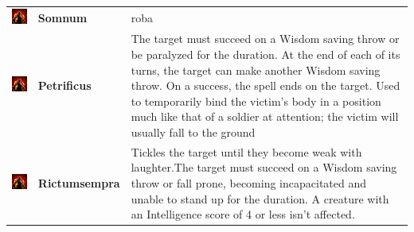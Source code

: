 \begin{tabular}{ m{4cm}m{3cm}m{6cm} } 
	\includegraphics[width=4cm]{../Pictures/Gameplay/Spells/Icon/spell_icon.png} & \textbf{Somnum} & roba \\ %
	\includegraphics[width=4cm]{../Pictures/Gameplay/Spells/Icon/spell_icon.png} & \textbf{Petrificus} & The target must succeed on a Wisdom saving throw or be paralyzed for the duration. At the end of each of its turns, the target can make another Wisdom saving throw. On a success, the spell ends on the target. Used to temporarily bind the victim's body in a position much like that of a soldier at attention; the victim will usually fall to the ground\\ 
	\includegraphics[width=4cm]{../Pictures/Gameplay/Spells/Icon/spell_icon.png} & \textbf{Rictumsempra} & Tickles the target until they become weak with laughter.The target must succeed on a Wisdom saving throw or fall prone, becoming incapacitated and unable to stand up for the duration. A creature with an Intelligence score of 4 or less isn't affected.\\ 
\end{tabular}

